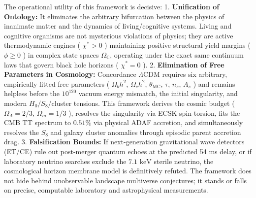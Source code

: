 \documentclass[11pt,a4paper]{article}
\theoremstyle{definition}
\theoremstyle{remark}
\begin{document}
The operational utility of this framework is decisive:
1. \textbf{Unification of Ontology:} It eliminates the arbitrary bifurcation between the physics of inanimate matter and the dynamics of living/cognitive systems. Living and cognitive organisms are not mysterious violations of physics; they are active thermodynamic engines ( $\chi^* > 0$ ) maintaining positive structural yield margins ( $\phi \ge 0$ ) in complex state spaces $\Omega_{\mathbb{C}}$, operating under the exact same continuum laws that govern black hole horizons ( $\chi^* = 0$ ).
2. \textbf{Elimination of Free Parameters in Cosmology:} Concordance $\Lambda\text{CDM}$ requires six arbitrary, empirically fitted free parameters ( $\Omega_b h^2$, $\Omega_c h^2$, $\theta_{\text{MC}}$, $\tau$, $n_s$, $A_s$ ) and remains helpless before the $10^{120}$ vacuum energy mismatch, the initial singularity, and modern $H_0/S_8$/cluster tensions. This framework derives the cosmic budget ( $\Omega_\Lambda = 2/3$, $\Omega_m = 1/3$ ), resolves the singularity via ECSK spin-torsion, fits the CMB TT spectrum to $0.51\%$ via physical ADAF accretion, and simultaneously resolves the $S_8$ and galaxy cluster anomalies through episodic parent accretion drag.
3. \textbf{Falsification Bounds:} If next-generation gravitational wave detectors (ET/CE) rule out post-merger quantum echoes at the predicted 54 ms delay, or if laboratory neutrino searches exclude the $7.1\text{ keV}$ sterile neutrino, the cosmological horizon membrane model is definitively refuted. The framework does not hide behind unobservable landscape multiverse conjectures; it stands or falls on precise, computable laboratory and astrophysical measurements.
\end{document}
